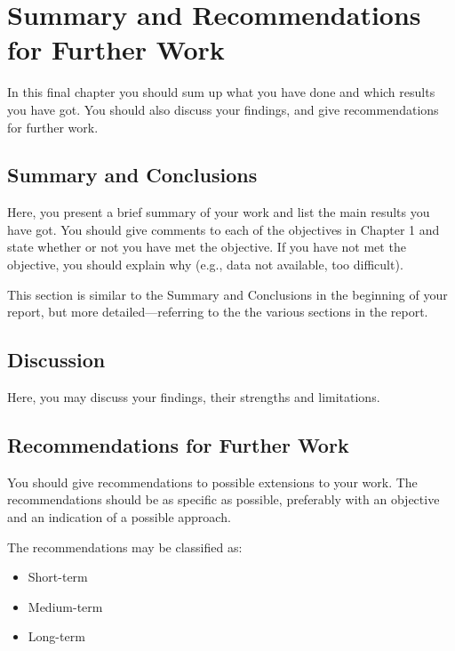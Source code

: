 \chapter[Summary]{Summary and Recommendations for Further Work}
In this final chapter you should sum up what you have done and which results you have got. You should also discuss your findings, and give recommendations for further work.

\section{Summary and Conclusions}
Here, you present a brief summary of your work and list the main results you have got. You should give comments to each of the objectives in Chapter 1 and state whether or not you have met the objective. If you have not met the objective, you should explain why (e.g., data not available, too difficult).

This section is similar to the Summary and Conclusions in the beginning of your report, but more detailed---referring to the the various sections in the report.

\section{Discussion}
Here, you may discuss your findings, their strengths and limitations.
\section{Recommendations for Further Work}
You should give recommendations to possible extensions to your work. The recommendations should be as specific as possible, preferably with an objective and an indication of a possible approach.

The recommendations may be classified as:
\begin{itemize}
\item Short-term
\item Medium-term
\item Long-term
\end{itemize}